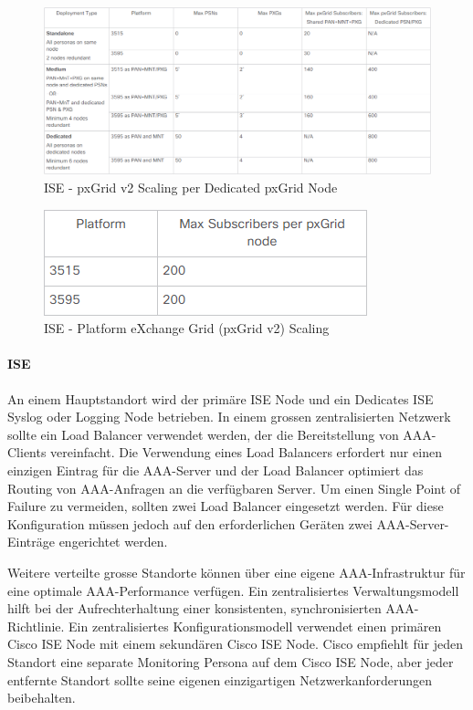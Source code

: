 \begin{figure}[H]
	\centering
	\includegraphics[width=1\linewidth]{img/Absicherung/ISE-PlatformpxGridV2Scaling}
	\caption{ISE - pxGrid v2 Scaling per Dedicated pxGrid Node \cite{ise-scale}}
	\label{fig:ISE - pxGrid v2 Scaling per Dedicated pxGrid Node}
\end{figure}

\begin{figure}[H]
	\centering
	\includegraphics[width=0.5\linewidth]{img/Absicherung/ISE-pxGridV2}
	\caption{ISE - Platform eXchange Grid (pxGrid v2) Scaling \cite{ise-scale}}
	\label{fig:ISE - Platform eXchange Grid (pxGrid v2) Scaling}
\end{figure}


\paragraph{ISE}
An einem Hauptstandort wird der primäre ISE Node und ein Dedicates ISE Syslog oder Logging Node betrieben. In einem grossen zentralisierten Netzwerk sollte ein Load Balancer verwendet werden, der die Bereitstellung von AAA-Clients vereinfacht. Die Verwendung eines Load Balancers erfordert nur einen einzigen Eintrag für die AAA-Server und der Load Balancer optimiert das Routing von AAA-Anfragen an die verfügbaren Server. Um einen Single Point of Failure zu vermeiden, sollten zwei Load Balancer eingesetzt werden. Für diese Konfiguration müssen jedoch auf den erforderlichen Geräten zwei AAA-Server-Einträge engerichtet werden.

Weitere verteilte grosse Standorte können über eine eigene AAA-Infrastruktur für eine optimale AAA-Performance verfügen. Ein zentralisiertes Verwaltungsmodell hilft bei der Aufrechterhaltung einer konsistenten, synchronisierten AAA-Richtlinie. Ein zentralisiertes Konfigurationsmodell verwendet einen primären Cisco ISE Node mit einem sekundären Cisco ISE Node. Cisco empfiehlt für jeden Standort eine separate Monitoring Persona auf dem Cisco ISE Node, aber jeder entfernte Standort sollte seine eigenen einzigartigen Netzwerkanforderungen beibehalten.


